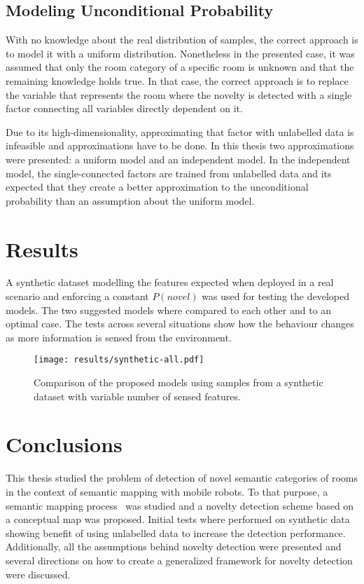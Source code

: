 \documentclass[9pt,a4paper]{extarticle}
\begin{document}
\begin{multicols}{2}
\subsection{Modeling Unconditional Probability}
With no knowledge about the real distribution of samples, the correct approach is to model it
with a uniform distribution. Nonetheless in the presented case, it was assumed that only the room
category of a specific room is unknown and that the remaining knowledge holds true.
In that case, the correct approach is to replace the variable that represents the room where the 
novelty is detected with a single factor connecting all variables directly dependent on it. 

Due to its high-dimensionality, approximating that factor with unlabelled data is infeasible and
approximations have to be done. In this thesis two approximations were presented: a uniform model
and an independent model. In the independent model, the single\hyp{}connected factors are trained from 
unlabelled data and its expected that they create a better approximation to the unconditional probability 
than an assumption about the uniform model.

\section{Results}
A synthetic dataset modelling the features expected when deployed in a real scenario and enforcing
a constant $P(novel)$ was used for testing the developed models. The two suggested models where compared 
to each other and to an optimal case. The tests across several situations show how the behaviour changes 
as more information is sensed from the environment.

\begin{figure}[H]
\centering
\texttt{[image: results/synthetic-all.pdf]}
\caption{\label{fig:results}Comparison of the proposed models using samples from a synthetic dataset
         with variable number of sensed features.}
\end{figure}

\section{Conclusions}
This thesis studied the problem of detection of novel semantic categories of rooms in the context of
semantic mapping with mobile robots. To that purpose, a semantic mapping process~\cite{pronobis2011semmap} 
was studied and a novelty detection scheme based on a conceptual map was proposed.
Initial tests where performed on synthetic data showing benefit of using unlabelled data to
increase the detection performance. Additionally, all the assumptions behind novelty detection were 
presented and several directions on how to create a generalized framework for novelty detection 
were discussed.




\end{multicols}
\end{document}
